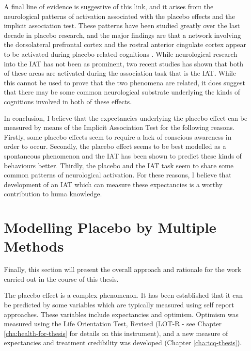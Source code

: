 A final line of evidence is suggestive of this link, and it arises from the neurological patterns of activation associated with the placebo effects and the implicit association test. These patterns have been studied greatly over the last decade in placebo research, and the major findings are that a network involving the dorsolateral prefrontal cortex and the rostral anterior cingulate cortex appear to be activated during placebo related cognitions \cite{Mayberg2002,Zubieta2006}. While neurological research into the IAT has not been as prominent, two recent studies  \cite{Knutson2007,Knutson2006} has shown that both of these areas are activated during the association task that is the IAT. While this cannot be used to prove that the two phenomena are related, it does suggest that there may be some common neurological substrate underlying the kinds of cognitions involved in both of these effects. 

In conclusion, I believe that the expectancies underlying the placebo effect can be measured by means of the Implicit Association Test for the following reasons. Firstly, some placebo effects seem to require a lack of conscious awareness in order to occur. Secondly, the placebo effect seems to be best modelled as a spontaneous phenomenon and the IAT has been shown to predict these kinds of behaviours better. Thirdly, the placebo and the IAT task seem to share some common patterns of neurological activation. For these reasons, I believe that  development of  an IAT which can measure these expectancies is a worthy contribution to huma knowledge. 

\section{Modelling Placebo by Multiple Methods}
\label{sec:modell-plac-mult}

Finally, this section will present the overall approach and rationale for the work carried out in the course of this thesis.

The placebo effect is a complex phenomenon. It has been established that it can be predicted by some variables which are typically measured using self report approaches. These variables include expectancies and optimism. Optimism was measured using the Life Orientation Test, Revised (LOT-R - see Chapter \ref{cha:health-for-thesis} for details on this instrument), and a new measure of expectancies and treatment credibility was developed (Chapter \ref{cha:tcq-thesis}). 

